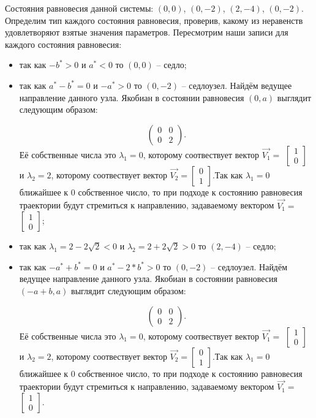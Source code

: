 Состояния равновесия данной системы: $(0, 0)$, $(0, -2)$, $(2, -4)$, $(0, -2)$. Определим тип каждого состояния равновесия, проверив, какому из неравенств удовлетворяют взятые значения параметров.  Пересмотрим наши записи для каждого состояния равновесия: 
\begin{itemize}
	\item{ так как $-b^\ast > 0 $ и $a^\ast  < 0 $ то $(0, 0)$ -- седло;}
	\item{ так как $a^\ast - b^\ast = 0 $ и $-a^\ast > 0 $ то $(0, -2)$ -- седлоузел. Найдём ведущее направление данного узла. Якобиан в состоянии равновесия $(0, a)$ выглядит следующим образом:
		
		$$\begin{pmatrix}0 & 0\\0 & 2\end{pmatrix}. $$Её собственные числа это $\lambda_1=0$, которому соотвествует вектор $\Vec{V_1}=$ $\left[\begin{matrix}1\\0\end{matrix}\right]$ и $\lambda_2=2$, которому соотвествует вектор $\Vec{V_2}=$$\left[\begin{matrix}0\\1\end{matrix}\right]$.Так как $\lambda_1=0$ ближайшее к $0$ собственное число, то при подходе к состоянию равновесия траектории будут стремиться к направлению, задаваемому вектором $\Vec{V_1}=$ $\left[\begin{matrix}1\\0\end{matrix}\right]$;}
	\item{ так как ${\lambda_{1}} = 2 - 2 \sqrt{2}$$  < 0 $ и ${\lambda_{2}} = 2 + 2 \sqrt{2}$$ > 0 $ то $(2, -4)$ -- седло;}
	\item{ так как $-a^\ast + b^\ast = 0 $ и $a^\ast - 2*b^\ast > 0 $ то $(0, -2)$ -- седлоузел. Найдём ведущее направление данного узла. Якобиан в состоянии равновесия $(-a + b, a)$ выглядит следующим образом:
		
		$$\begin{pmatrix}0 & 0\\0 & 2\end{pmatrix}. $$Её собственные числа это $\lambda_1=0$, которому соотвествует вектор $\Vec{V_1}=$ $\left[\begin{matrix}1\\0\end{matrix}\right]$ и $\lambda_2=2$, которому соотвествует вектор $\Vec{V_2}=$$\left[\begin{matrix}0\\1\end{matrix}\right]$.Так как $\lambda_1=0$ ближайшее к $0$ собственное число, то при подходе к состоянию равновесия траектории будут стремиться к направлению, задаваемому вектором $\Vec{V_1}=$ $\left[\begin{matrix}1\\0\end{matrix}\right]$.}
\end{itemize} 

